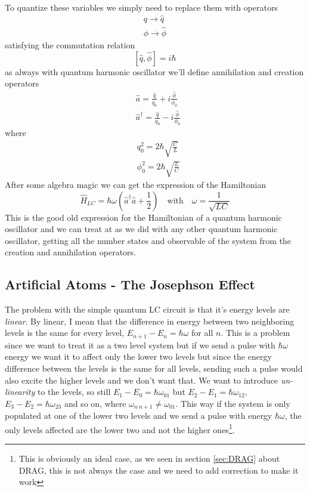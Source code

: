 \documentclass[english, a4paper, 12pt, twoside]{article}
\numberwithin{equation}{section} %
\begin{document}
To quantize these variables we simply need to replace them with operators
\begin{align*}
    q \rightarrow \hat{q} \\
    \phi \rightarrow \hat{\phi}
\end{align*}
satisfying the commutation relation
\[
    [\hat{q}, \hat{\phi}] = i\hbar
\]
as always with quantum harmonic oscillator we'll define annihilation and creation operators
\begin{align*}
    &\hat{a} = \frac{\hat{q}}{q_0} + i\frac{\hat{\phi}}{\phi_0} \\
    &\hat{a}^\dag = \frac{\hat{q}}{q_0} - i\frac{\hat{\phi}}{\phi_0}
\end{align*}
where
\begin{align*}
    &q_0^2 = 2\hbar\sqrt{\frac{C}{L}} \\
    &\phi_0^2 = 2\hbar\sqrt{\frac{L}{C}}
\end{align*}
After some algebra magic we can get the expression of the Hamiltonian
\[
    \hat{H}_{LC} = \hbar \omega (\hat{a}^\dag \hat{a} + \frac{1}{2}) \quad \text{with} \quad \omega = \frac{1}{\sqrt{LC}}
\]
This is the good old expression for the Hamiltonian of a quantum harmonic oscillator and we can treat at as we did with any other quantum harmonic oscillator, getting all the number states and observable of the system from the creation and annihilation operators.

\subsection{Artificial Atoms - The Josephson Effect}
The problem with the simple quantum LC circuit is that it's energy levels are \textit{linear}. By linear, I mean that the difference in energy between two neighboring levels is the same for every level, $E_{n + 1} - E_n = \hbar \omega$ for all $n$. This is a problem since we want to treat it as a two level system but if we send a pulse with $\hbar \omega$ energy we want it to affect only the lower two levels but since the energy difference between the levels is the same for all levels, sending such a pulse would also excite the higher levels and we don't want that.
We want to introduce \textit{un-linearity} to the levels, so still $E_1 - E_0 = \hbar \omega_{01} $ but $E_2 - E_1 = \hbar \omega_{12}$, $E_3 - E_2 = \hbar \omega_{23}$ and so on, where $\omega_{n\ n+1} \ne \omega_{01}$. This way if the system is only populated at one of the lower two levels and we send a pulse with energy $\hbar \omega$, the only levels affected are the lower two and not the higher ones\footnote{This is obviously an ideal case, as we seen in section \ref{sec:DRAG} about DRAG, this is not always the case and we need to add correction to make it work}.
\end{document}
